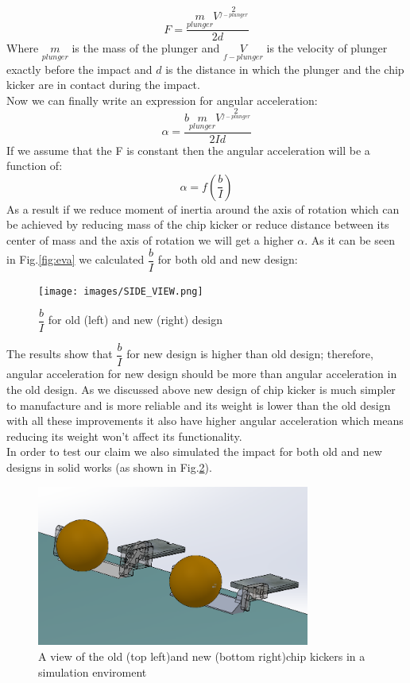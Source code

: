 \begin{equation}
F=\dfrac{m\limits_{plunger} {V}^2\limits_{f-plunger}}{2d}
\end{equation}
Where $m\limits_{plunger}$ is the mass of the plunger and ${V}\limits_{f-plunger}$ is the velocity of plunger exactly before the impact and $d$ is the distance in which the plunger and the chip kicker are in contact during the impact.\\
Now we can finally write an expression for angular acceleration:
\begin{equation}
\alpha = \dfrac{b m\limits_{plunger} {V}^2\limits_{f-plunger}}{2Id}
\end{equation}
If we assume that the F is constant then the angular acceleration will be a function of:
\begin{equation}
\alpha=f(\dfrac{b}{I})
\end{equation}
As a result if we reduce moment of inertia around the axis of rotation which can be achieved by reducing mass of the chip kicker or reduce distance between its center of mass and the axis of rotation we will get a higher $\alpha$.
As it can be seen in Fig.\ref{fig:eva} we calculated $\dfrac{b}{I}$ for both old and new design:
\begin{figure}
	\centering
	\texttt{[image: images/SIDE\_VIEW.png]}
	\caption{$\dfrac{b}{I}$ for old (left) and new (right) design}
	\label{fig:CHIP_SIDE_VIEW}
\end{figure}
The results show that $\dfrac{b}{I}$ for new design is higher than old design; therefore, angular acceleration for new design should be more than angular acceleration in the old design. As we discussed above new design of chip kicker is much simpler to manufacture and is more reliable and its weight is lower than the old design with all these improvements it also have higher angular acceleration which means reducing its weight won’t affect its functionality.\\
In order to test our claim we also simulated the impact for both old and new designs in solid works (as shown in Fig.\ref{fig:SIM2CHIP}).\\
\begin{figure}
	\centering
	\includegraphics[width=0.8\textwidth]{images/SIM_CHIPx2.png}
	\caption{A view of the old (top left)and new (bottom right)chip kickers in a simulation enviroment}
	\label{fig:SIM2CHIP}
\end{figure}\\
